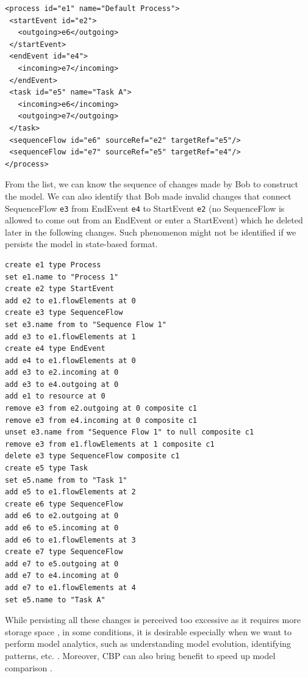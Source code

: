 \documentclass[conference]{IEEEtran}
\begin{document}
\vspace{-15pt}
\begin{lstlisting}[style=eol,numbersep=1pt,caption={A BPMN2 model in Fig. \ref{fig:bpmn2} persisted in simplified XMI.},label=lst:bpmn2_xmi]
<process id="e1" name="Default Process">
 <startEvent id="e2">
   <outgoing>e6</outgoing>
 </startEvent>
 <endEvent id="e4">
   <incoming>e7</incoming>
 </endEvent>
 <task id="e5" name="Task A">
   <incoming>e6</incoming>
   <outgoing>e7</outgoing>
 </task>
 <sequenceFlow id="e6" sourceRef="e2" targetRef="e5"/>
 <sequenceFlow id="e7" sourceRef="e5" targetRef="e4"/>
</process>
\end{lstlisting}

From the list, we can know the sequence of changes made by Bob to construct the model. We can also identify that Bob made invalid changes 
that connect SequenceFlow \texttt{e3} from EndEvent \texttt{e4} to StartEvent \texttt{e2} 
(no SequenceFlow is allowed to come out from an EndEvent or enter a StartEvent) which he deleted later in the following changes. 
Such phenomenon might not be identified if we persists the model in state-based format. 

\vspace{-15pt}
\begin{lstlisting}[style=eol,numbersep=5pt,caption={The pseudo-formatted CBP of the model in Fig. \ref{fig:bpmn2}.},label=lst:bpmn2_cbp]
create e1 type Process
set e1.name to "Process 1"
create e2 type StartEvent
add e2 to e1.flowElements at 0
create e3 type SequenceFlow
set e3.name from to "Sequence Flow 1"
add e3 to e1.flowElements at 1
create e4 type EndEvent
add e4 to e1.flowElements at 0
add e3 to e2.incoming at 0
add e3 to e4.outgoing at 0
add e1 to resource at 0
remove e3 from e2.outgoing at 0 composite c1
remove e3 from e4.incoming at 0 composite c1
unset e3.name from "Sequence Flow 1" to null composite c1
remove e3 from e1.flowElements at 1 composite c1
delete e3 type SequenceFlow composite c1
create e5 type Task
set e5.name from to "Task 1"
add e5 to e1.flowElements at 2
create e6 type SequenceFlow
add e6 to e2.outgoing at 0
add e6 to e5.incoming at 0
add e6 to e1.flowElements at 3
create e7 type SequenceFlow
add e7 to e5.outgoing at 0
add e7 to e4.incoming at 0
add e7 to e1.flowElements at 4
set e5.name to "Task A"
\end{lstlisting}

While persisting all these changes is perceived too excessive as it requires more storage space \cite{DBLP:conf/models/YohannisRPK18}, 
in some conditions, it is desirable especially when we want to perform model analytics, 
such as understanding model evolution, identifying patterns, etc. \cite{DBLP:conf/models/YohannisKP17}. 
Moreover, CBP can also bring benefit to speed up model comparison \cite{yohannis2018efficient}.
\end{document}
